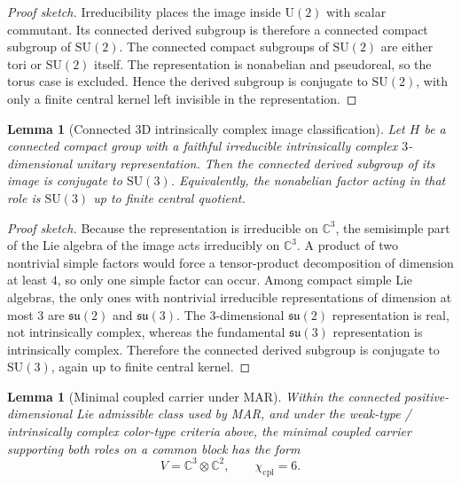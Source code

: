 \documentclass[11pt]{article}
\newtheorem{lemma}[theorem]{Lemma}
\newcommand{\SU}{\mathrm{SU}}
\newcommand{\U}{\mathrm{U}}
\begin{document}
\begin{proof}[Proof sketch]
Irreducibility places the image inside $\U(2)$ with scalar commutant. Its connected derived subgroup is therefore a connected compact subgroup of $\SU(2)$. The connected compact subgroups of $\SU(2)$ are either tori or $\SU(2)$ itself. The representation is nonabelian and pseudoreal, so the torus case is excluded. Hence the derived subgroup is conjugate to $\SU(2)$, with only a finite central kernel left invisible in the representation.
\end{proof}

\begin{lemma}[Connected 3D intrinsically complex image classification]\label{lem:su3class}
Let $H$ be a connected compact group with a faithful irreducible intrinsically complex $3$-dimensional unitary representation. Then the connected derived subgroup of its image is conjugate to $\SU(3)$. Equivalently, the nonabelian factor acting in that role is $\SU(3)$ up to finite central quotient.
\end{lemma}

\begin{proof}[Proof sketch]
Because the representation is irreducible on $\mathbb C^3$, the semisimple part of the Lie algebra of the image acts irreducibly on $\mathbb C^3$. A product of two nontrivial simple factors would force a tensor-product decomposition of dimension at least $4$, so only one simple factor can occur. Among compact simple Lie algebras, the only ones with nontrivial irreducible representations of dimension at most $3$ are $\mathfrak{su}(2)$ and $\mathfrak{su}(3)$. The $3$-dimensional $\mathfrak{su}(2)$ representation is real, not intrinsically complex, whereas the fundamental $\mathfrak{su}(3)$ representation is intrinsically complex. Therefore the connected derived subgroup is conjugate to $\SU(3)$, again up to finite central kernel.
\end{proof}

\begin{lemma}[Minimal coupled carrier under MAR]\label{lem:carrier}
Within the connected positive-dimensional Lie admissible class used by MAR, and under the weak-type / intrinsically complex color-type criteria above, the minimal coupled carrier supporting both roles on a common block has the form
\[
V=\mathbb C^3\otimes \mathbb C^2,
\qquad
\chi_{\mathrm{cpl}}=6.
\]
\end{lemma}
\end{document}
